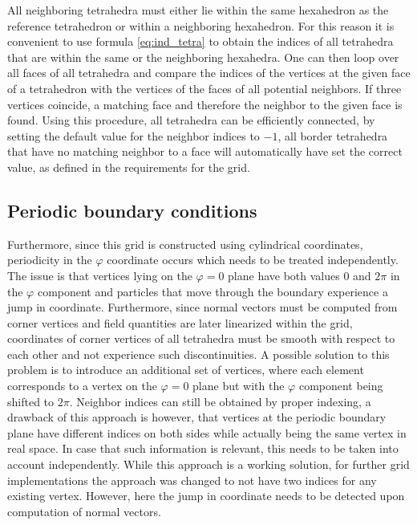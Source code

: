 \documentclass[./main.tex]{subfiles}
\begin{document}
All neighboring tetrahedra must either lie within the same hexahedron as the reference tetrahedron or within a neighboring hexahedron. For this reason it is convenient to use formula \ref{eq:ind_tetra} to obtain the indices of all tetrahedra that are within the same or the neighboring hexahedra. One can then loop over all faces of all tetrahedra and compare the indices of the vertices at the given face of a tetrahedron with the vertices of the faces of all potential neighbors. If three vertices coincide, a matching face and therefore the neighbor to the given face is found. Using this procedure, all tetrahedra can be efficiently connected, by setting the default value for the neighbor indices to $-1$, all border tetrahedra that have no matching neighbor to a face will automatically have set the correct value, as defined in the requirements for the grid.
\subsection{Periodic boundary conditions}
Furthermore, since this grid is constructed using cylindrical coordinates, periodicity in the $\varphi$ coordinate occurs which needs to be treated independently. The issue is that vertices lying on the $\varphi = 0$ plane have both values $0$ and $2\pi$ in the $\varphi$ component and particles that move through the boundary experience a jump in coordinate. Furthermore, since normal vectors must be computed from corner vertices and field quantities are later linearized within the grid, coordinates of corner vertices of all tetrahedra must be smooth with respect to each other and not experience such discontinuities. A possible solution to this problem is to introduce an additional set of vertices, where each element corresponds to a vertex on the $\varphi= 0$ plane but with the $\varphi$ component being shifted to $2\pi$. Neighbor indices can still be obtained by proper indexing, a drawback of this approach is however, that vertices at the periodic boundary plane have different indices on both sides while actually being the same vertex in real space. In case that such information is relevant, this needs to be taken into account independently. While this approach is a working solution, for further grid implementations the approach was changed to not have two indices for any existing vertex. However, here the jump in coordinate needs to be detected upon computation of normal vectors.  
\end{document}
